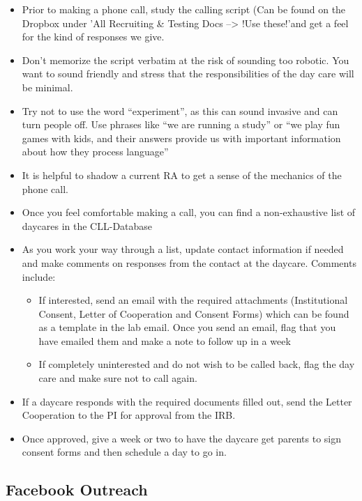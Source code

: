 \documentclass[
]{book}
\providecommand{\tightlist}{%
  \setlength{\itemsep}{0pt}\setlength{\parskip}{0pt}}
\begin{document}
\begin{itemize}
\tightlist
\item
  Prior to making a phone call, study the calling script (Can be found on the Dropbox under 'All Recruiting \& Testing Docs --\textgreater{} !Use these!'and get a feel for the kind of responses we give.
\item
  Don't memorize the script verbatim at the risk of sounding too robotic. You want to sound friendly and stress that the responsibilities of the day care will be minimal.
\item
  Try not to use the word ``experiment'', as this can sound invasive and can turn people off. Use phrases like ``we are running a study'' or ``we play fun games with kids, and their answers provide us with important information about how they process language''
\item
  It is helpful to shadow a current RA to get a sense of the mechanics of the phone call.
\item
  Once you feel comfortable making a call, you can find a non-exhaustive list of daycares in the CLL-Database
\item
  As you work your way through a list, update contact information if needed and make comments on responses from the contact at the daycare. Comments include:

  \begin{itemize}
  \tightlist
  \item
    If interested, send an email with the required attachments (Institutional Consent, Letter of Cooperation and Consent Forms) which can be found as a template in the lab email. Once you send an email, flag that you have emailed them and make a note to follow up in a week
  \item
    If completely uninterested and do not wish to be called back, flag the day care and make sure not to call again.
  \end{itemize}
\item
  If a daycare responds with the required documents filled out, send the Letter Cooperation to the PI for approval from the IRB.
\item
  Once approved, give a week or two to have the daycare get parents to sign consent forms and then schedule a day to go in.
\end{itemize}

\hypertarget{facebook-outreach}{%
\subsection*{Facebook Outreach}\label{facebook-outreach}}
\end{document}
